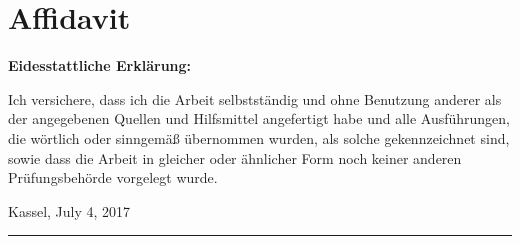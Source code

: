 \chapter*{Affidavit}
\begin{Large}
	\textbf{Eidesstattliche Erklärung:}
\end{Large}

Ich versichere, dass ich die Arbeit selbstständig und ohne Benutzung anderer als der angegebenen Quellen und Hilfsmittel angefertigt habe und alle Ausführungen, die wörtlich oder sinngemäß übernommen wurden, als solche gekennzeichnet sind, sowie dass die Arbeit in gleicher oder ähnlicher Form noch keiner anderen Prüfungsbehörde vorgelegt wurde.

\vspace*{2cm}

\qquad Kassel, July 4, 2017 \hfill
\rule{0.45\textwidth}{0.4pt}
